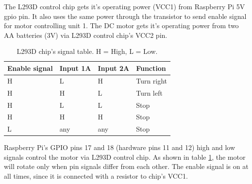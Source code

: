 \documentclass[english,11pt,twoside,a4paper]{article}
\begin{document}
The L293D control chip gets it's operating power (VCC1) from Raspberry Pi 5V gpio pin. It also uses the same power through the transistor to send enable signal for motor controlling unit 1. The DC motor gets it's operating power from two AA batteries (3V) via L293D control chip's VCC2 pin.

\begin{table}
  \begin{center}
    \begin{tabular}{| l | l | l | l |}
      \hline
      Enable signal & Input 1A & Input 2A & Function \\ \hline
      H & L & H & Turn right \\ \hline
      H & H & L & Turn left \\ \hline
	  H & L & L & Stop \\ \hline
	  H & H & H & Stop \\ \hline
	  L & any & any & Stop \\ \hline
    \end{tabular}
    \caption{L293D chip's signal table. H = High, L = Low.}
  \end{center}
  \label{l293d_signal_table}
\end{table}

Raspberry Pi's GPIO pins 17 and 18 (hardware pins 11 and 12) high and low signals control the motor via L293D control chip. As shown in table \ref{l293d_signal_table}, the motor will rotate only when pin signals differ from each other. The enable signal is on at all times, since it is connected with a resistor to chip's VCC1.
\end{document}
